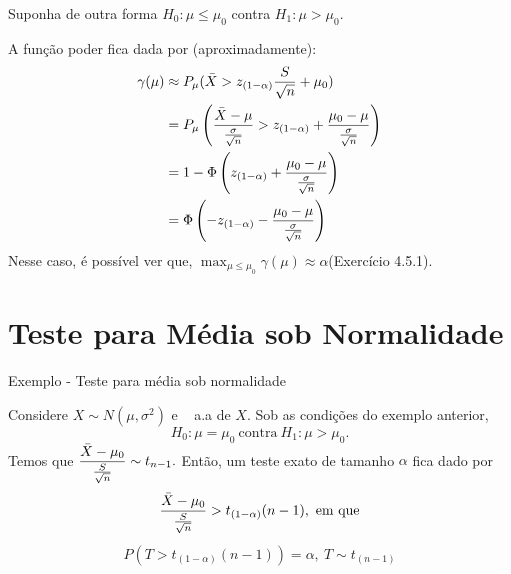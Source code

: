 \documentclass[12pt]{beamer}
\begin{document}
\begin{frame}{}
\vspace{-0.2cm}
\begin{block}{}
\justifying
Suponha de outra forma $H_{0}:\mu\leq \mu_{0}$ contra $H_{1}:\mu>\mu_{0}.$
\end{block}
\pause
\begin{block}{}
\justifying
A função poder fica dada por (aproximadamente):
\begin{align*}
    \gamma(\mu)&\approx P_{\mu}(\Bar{X}>z_{(1-\alpha)}\frac{S}{\sqrt{n}}+\mu_{0})\\
    &=P_{\mu}\left(\dfrac{\Bar{X}-\mu}{\frac{\sigma}{\sqrt{n}}}>z_{(1-\alpha)}+\dfrac{\mu_{0}-\mu}{\frac{\sigma}{\sqrt{n}}}\right)\\
    &=1-\Phi\left(z_{(1-\alpha)}+\dfrac{\mu_{0}-\mu}{\frac{\sigma}{\sqrt{n}}}\right)\\
    &=\Phi\left(-z_{(1-\alpha)}-\dfrac{\mu_{0}-\mu}{\frac{\sigma}{\sqrt{n}}}\right)
\end{align*}
Nesse caso, é possível ver que, \({\displaystyle \max_{\mu\leq\mu_{0}}\gamma(\mu)\approx\alpha}\)(Exercício 4.5.1).
\end{block}
\end{frame}

\section{Teste para Média sob Normalidade}
\begin{frame}{Exemplo - Teste para média sob normalidade}
\begin{block}{}
\justifying
Considere $X\sim N(\mu,\sigma^{2})$ e \seqX~ a.a de $X.$ Sob as condições do exemplo anterior,
\[H_{0}:\mu= \mu_{0}~\text{contra}~H_{1}:\mu>\mu_{0}.\]
Temos que $\dfrac{\Bar{X}-\mu_{0}}{\frac{S}{\sqrt{n}}}\sim t_{n-1}.$ Então, um teste exato de tamanho $\alpha$ fica dado por
\begin{align*}
    \dfrac{\Bar{X}-\mu_{0}}{\frac{S}{\sqrt{n}}}>t_{(1-\alpha)}(n-1),~\text{em que}
\end{align*}
\begin{align*}
    P(T>t_{(1-\alpha)}(n-1))=\alpha,~T\sim t_{(n-1)}
\end{align*}
\end{block}
\end{frame}
\end{document}
